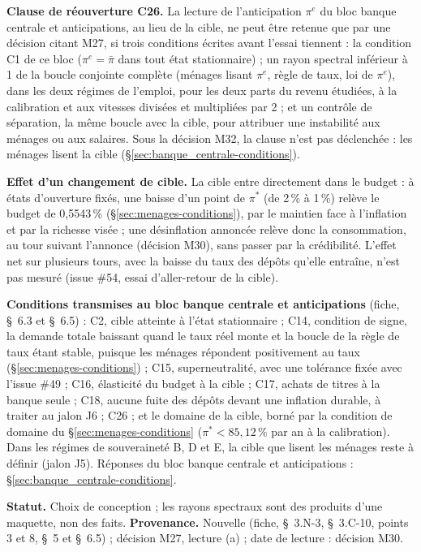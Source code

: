 \documentclass[11pt,a4paper]{article}
\begin{document}
\begin{proposee}
\begin{itemize}
\end{itemize}
\textbf{Clause de réouverture C26.} La lecture de l'anticipation $\pi^e$ du bloc banque centrale et anticipations, au lieu de la cible, ne peut être retenue que par une décision citant M27, si trois conditions écrites avant l'essai tiennent : la condition C1 de ce bloc ($\pi^e = \bar\pi$ dans tout état stationnaire) ; un rayon spectral inférieur à 1 de la boucle conjointe complète (ménages lisant $\pi^e$, règle de taux, loi de $\pi^e$), dans les deux régimes de l'emploi, pour les deux parts du revenu étudiées, à la calibration et aux vitesses divisées et multipliées par 2 ; et un contrôle de séparation, la même boucle avec la cible, pour attribuer une instabilité aux ménages ou aux salaires. Sous la décision M32, la clause n'est pas déclenchée : les ménages lisent la cible (\S\ref{sec:banque_centrale-conditions}).

\textbf{Effet d'un changement de cible.} La cible entre directement dans le budget : à états d'ouverture fixés, une baisse d'un point de $\pi^\ast$ (de 2\,\% à 1\,\%) relève le budget de 0,5543\,\% (\S\ref{sec:menages-conditions}), par le maintien face à l'inflation et par la richesse visée ; une désinflation annoncée relève donc la consommation, au tour suivant l'annonce (décision M30), sans passer par la crédibilité. L'effet net sur plusieurs tours, avec la baisse du taux des dépôts qu'elle entraîne, n'est pas mesuré (issue \#54, essai d'aller-retour de la cible).

\textbf{Conditions transmises au bloc banque centrale et anticipations} (fiche, \S~6.3 et \S~6.5) : C2, cible atteinte à l'état stationnaire ; C14, condition de signe, la demande totale baissant quand le taux réel monte et la boucle de la règle de taux étant stable, puisque les ménages répondent positivement au taux (\S\ref{sec:menages-conditions}) ; C15, superneutralité, avec une tolérance fixée avec l'issue \#49 ; C16, élasticité du budget à la cible ; C17, achats de titres à la banque seule ; C18, aucune fuite des dépôts devant une inflation durable, à traiter au jalon J6 ; C26 ; et le domaine de la cible, borné par la condition de domaine du \S\ref{sec:menages-conditions} ($\pi^\ast < 85{,}12\,\%$ par an à la calibration). Dans les régimes de souveraineté B, D et E, la cible que lisent les ménages reste à définir (jalon J5). Réponses du bloc banque centrale et anticipations : \S\ref{sec:banque_centrale-conditions}.

\textbf{Statut.} Choix de conception ; les rayons spectraux sont des produits d'une maquette, non des faits. \textbf{Provenance.} Nouvelle (fiche, \S~3.N-3, \S~3.C-10, points 3 et 8, \S~5 et \S~6.5) ; décision M27, lecture (a) ; date de lecture : décision M30.
\end{proposee}
\end{document}
